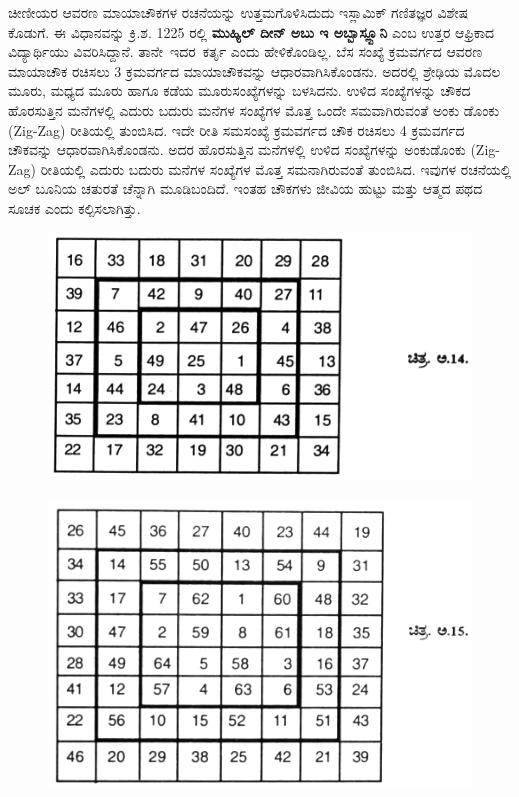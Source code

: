 ಚೀಣೀಯರ ಆವರಣ ಮಾಯಾಚೌಕಗಳ ರಚನೆಯನ್ನು ಉತ್ತಮಗೊಳಿಸಿದುದು ಇಸ್ಲಾಮಿಕ್ ಗಣಿತಜ್ಞರ ವಿಶೇಷ ಕೊಡುಗೆ. ಈ ವಿಧಾನವನ್ನು ಕ್ರಿ.ಶ. 1225 ರಲ್ಲಿ \textbf{ಮುಹ್ಯಿಲ್ ದೀನ್ ಅಬು ಇ ಅಬ್ಬಾಸ್ಲ್ಬೂನಿ } ಎಂಬ ಉತ್ತರ ಆಫ್ರಿಕಾದ ವಿದ್ಯಾರ್ಥಿಯು ವಿವರಿಸಿದ್ದಾನೆ. \hbox{ತಾನೇ ಇದರ ಕರ್ತೃ} ಎಂದು ಹೇಳಿಕೊಂಡಿಲ್ಲ. ಬೆಸ ಸಂಖ್ಯೆ ಕ್ರಮವರ್ಗದ ಆವರಣ ಮಾಯಾಚೌಕ ರಚಿಸಲು 3 ಕ್ರಮವರ್ಗದ ಮಾಯಾಚೌಕವನ್ನು ಆಧಾರವಾಗಿಸಿಕೊಂಡನು. ಅದರಲ್ಲಿ ಶ್ರೇಢಿಯ ಮೊದಲ ಮೂರು, ಮಧ್ಯದ ಮೂರು ಹಾಗೂ ಕಡೆಯ ಮೂರುಸಂಖ್ಯೆಗಳನ್ನು ಬಳಸಿದನು. ಉಳಿದ ಸಂಖ್ಯೆಗಳನ್ನು ಚೌಕದ ಹೊರಸುತ್ತಿನ ಮನೆಗಳಲ್ಲಿ ಎದುರು ಬದುರು ಮನೆಗಳ ಸಂಖ್ಯೆಗಳ ಮೊತ್ತ ಒಂದೇ ಸಮವಾಗಿರುವಂತೆ ಅಂಕು ಡೊಂಕು (Zig-Zag) ರೀತಿಯಲ್ಲಿ \break ತುಂಬಿಸಿದ. ಇದೇ ರೀತಿ ಸಮಸಂಖ್ಯೆ ಕ್ರಮವರ್ಗದ ಚೌಕ ರಚಿಸಲು 4 ಕ್ರಮವರ್ಗದ ಚೌಕ\-ವನ್ನು ಆಧಾರವಾಗಿಸಿಕೊಂಡನು. ಅದರ ಹೊರಸುತ್ತಿನ ಮನೆಗಳಲ್ಲಿ ಉಳಿದ ಸಂಖ್ಯೆಗಳನ್ನು ಅಂಕು\-ಡೊಂಕು (Zig-Zag) ರೀತಿಯಲ್ಲಿ ಎದುರು ಬದುರು ಮನೆಗಳ ಸಂಖ್ಯೆಗಳ ಮೊತ್ತ ಸಮನಾಗಿರುವಂತೆ ತುಂಬಿಸಿದ. ಇವುಗಳ ರಚನೆಯಲ್ಲಿ ಅಲ್ ಬೂನಿಯ ಚತುರತೆ ಚೆನ್ನಾಗಿ ಮೂಡಿಬಂದಿದೆ. ಇಂತಹ ಚೌಕಗಳು ಜೀವಿಯ ಹುಟ್ಟು ಮತ್ತು ಆತ್ಮದ ಪಥದ ಸೂಚಕ ಎಂದು ಕಲ್ಪಿಸಲಾಗಿತ್ತು.
\begin{figure}[H]
\includegraphics[scale=.85]{src/figures/chap9/fig9-10.jpg}
\end{figure}
\begin{figure}[H]
\includegraphics[scale=.85]{src/figures/chap9/fig9-11.jpg}
\end{figure}

